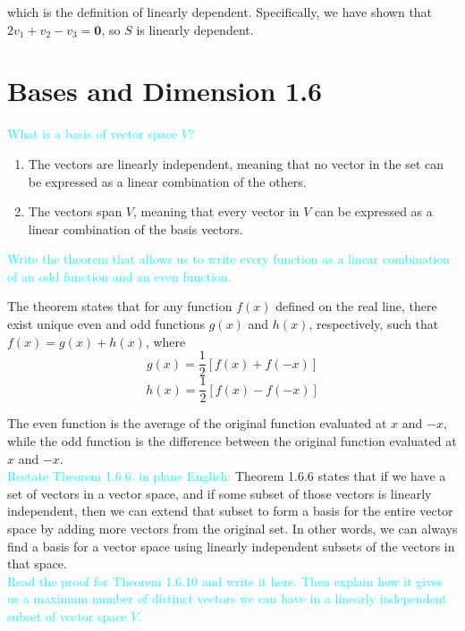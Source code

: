 \documentclass[fontsize=12pt]{scrartcl}
\begin{document}
which is the definition of linearly dependent. Specifically, we have shown that $2v_1 + v_2 - v_3 = \mathbf{0}$, so $S$ is linearly dependent.

\newpage

\section{Bases and Dimension 1.6}

\noindent
\textcolor{cyan}{What is a basis of vector space $V$?}

\noindent
\begin{enumerate}
	\item The vectors are linearly independent, meaning that no vector in the set can be expressed as a linear combination of the others.
	\item The vectors span $V$, meaning that every vector in $V$ can be expressed as a linear combination of the basis vectors.
\end{enumerate}

\noindent
\textcolor{cyan}{Write the theorem that allows us to write every function as a linear combination of an odd function and an even function.}

\noindent
The theorem states that for any function $f(x)$ defined on the real line, there exist unique even and odd functions $g(x)$ and $h(x)$, respectively, such that $f(x) = g(x) + h(x)$, where
$$g(x) = \frac{1}{2}[f(x) + f(-x)]$$
$$h(x) = \frac{1}{2}[f(x) - f(-x)]$$

\noindent
The even function is the average of the original function evaluated at $x$ and $-x$, while the odd function is the difference between the original function evaluated at $x$ and $-x$.
\\

\noindent
\textcolor{cyan}{Restate Theorem 1.6.6. in plane English:} Theorem 1.6.6 states that if we have a set of vectors in a vector space, and if some subset of those vectors is linearly independent, then we can extend that subset to form a basis for the entire vector space by adding more vectors from the original set. In other words, we can always find a basis for a vector space using linearly independent subsets of the vectors in that space.
\\
\newpage
\noindent
\textcolor{cyan}{Read the proof for Theorem 1.6.10 and write it here. Then explain how it gives us a maximum number of distinct vectors we can have in a linearly independent subset of vector space $V$.}
\end{document}
